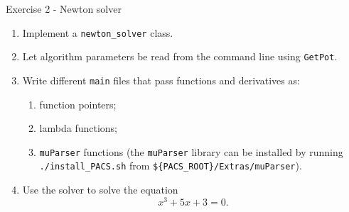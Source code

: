 \documentclass[10pt]{beamer}
\begin{document}
\begin{frame}{Exercise 2 - Newton solver}
\begin{enumerate}
\item Implement a \texttt{newton\_solver} class.
\item Let algorithm parameters be read from the command line using \texttt{GetPot}.
\item Write different \texttt{main} files that pass functions and derivatives as:
\begin{enumerate}
\item function pointers;
\item lambda functions;
\item \texttt{muParser} functions (the \texttt{muParser} library can be installed by running \texttt{./install\_PACS.sh} from \texttt{\$\{PACS\_ROOT\}/Extras/muParser}).
\end{enumerate}
\item Use the solver to solve the equation
\begin{equation*}
x^3 + 5 x + 3 = 0.
\end{equation*}
\end{enumerate}
\end{frame}
\end{document}
